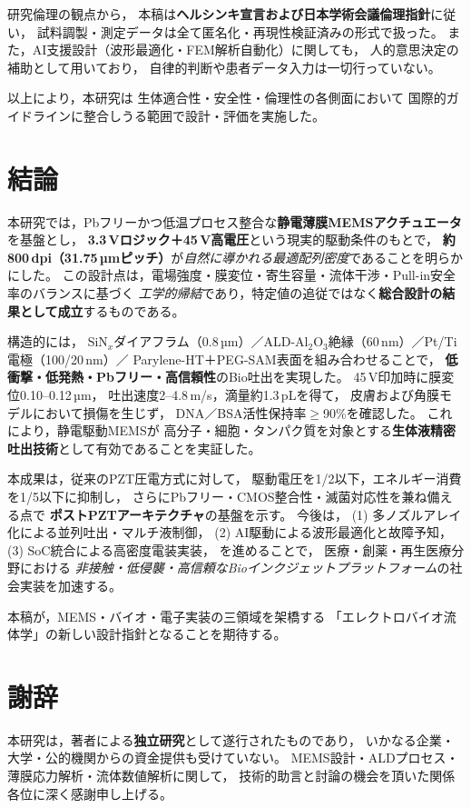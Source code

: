 \documentclass[conference]{IEEEtran}
\begin{document}
研究倫理の観点から，
本稿は\textbf{ヘルシンキ宣言および日本学術会議倫理指針}に従い，
試料調製・測定データは全て匿名化・再現性検証済みの形式で扱った。
また，AI支援設計（波形最適化・FEM解析自動化）に関しても，
人的意思決定の補助として用いており，
自律的判断や患者データ入力は一切行っていない。

\vspace{3pt}
\noindent
以上により，本研究は
生体適合性・安全性・倫理性の各側面において
国際的ガイドラインに整合しうる範囲で設計・評価を実施した。

\section{結論}
本研究では，Pbフリーかつ低温プロセス整合な\textbf{静電薄膜MEMSアクチュエータ}を基盤とし，
\textbf{3.3\,Vロジック＋45\,V高電圧}という現実的駆動条件のもとで，
\textbf{約800\,dpi（31.75\,µmピッチ）}が\emph{自然に導かれる最適配列密度}であることを明らかにした。
この設計点は，電場強度・膜変位・寄生容量・流体干渉・Pull-in安全率のバランスに基づく
\emph{工学的帰結}であり，特定値の追従ではなく\textbf{総合設計の結果として成立}するものである。

構造的には，
SiN$_x$ダイアフラム（0.8\,µm）／ALD-Al$_2$O$_3$絶縁（60\,nm）／Pt/Ti電極（100/20\,nm）／
Parylene-HT＋PEG-SAM表面を組み合わせることで，
\textbf{低衝撃・低発熱・Pbフリー・高信頼性}のBio吐出を実現した。
45\,V印加時に膜変位0.10--0.12\,µm，
吐出速度2--4.8\,m/s，滴量約1.3\,pLを得て，
皮膚および角膜モデルにおいて損傷を生じず，
DNA／BSA活性保持率$\ge$90\%を確認した。
これにより，静電駆動MEMSが
高分子・細胞・タンパク質を対象とする\textbf{生体液精密吐出技術}として有効であることを実証した。

本成果は，従来のPZT圧電方式に対して，
駆動電圧を1/2以下，エネルギー消費を1/5以下に抑制し，
さらにPbフリー・CMOS整合性・滅菌対応性を兼ね備える点で
\textbf{ポストPZTアーキテクチャ}の基盤を示す。
今後は，
(1) 多ノズルアレイ化による並列吐出・マルチ液制御，  
(2) AI駆動による波形最適化と故障予知，  
(3) SoC統合による高密度電装実装，  
を進めることで，
医療・創薬・再生医療分野における
\emph{非接触・低侵襲・高信頼なBioインクジェットプラットフォーム}の社会実装を加速する。

\vspace{3pt}
\noindent
本稿が，MEMS・バイオ・電子実装の三領域を架橋する
「エレクトロバイオ流体学」の新しい設計指針となることを期待する。

\section*{謝辞}
本研究は，著者による\textbf{独立研究}として遂行されたものであり，
いかなる企業・大学・公的機関からの資金提供も受けていない。
MEMS設計・ALDプロセス・薄膜応力解析・流体数値解析に関して，
技術的助言と討論の機会を頂いた関係各位に深く感謝申し上げる。
\end{document}
